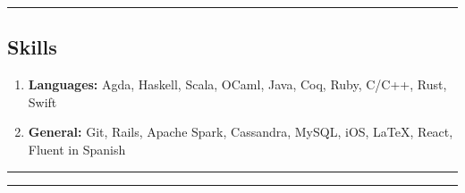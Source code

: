 \documentclass[letterpaper]{article}
\begin{document}
\hrule
\vspace{-0.6em}
\subsection*{Skills}
\begin{enumerate}[label=]
	\parskip=-0.25em

	\item
	\textbf{Languages: } Agda, Haskell, Scala, OCaml, Java, Coq, Ruby, C/C++, Rust, Swift

	\item
	\textbf{General: } Git, Rails, Apache Spark, Cassandra, MySQL, iOS, \LaTeX, React, Fluent in Spanish

\end{enumerate}

\hrule

\newpage

\hrule
\end{document}
